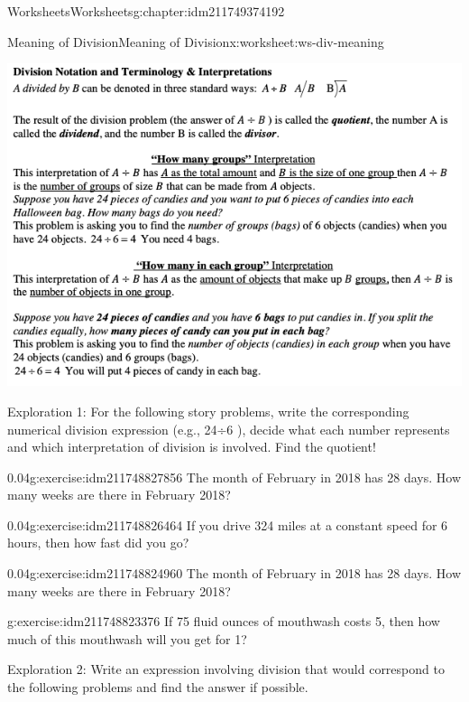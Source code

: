 \documentclass[twoside,11pt,]{book}
\begin{document}
\begin{chapterptx}{Worksheets}{}{Worksheets}{}{}{g:chapter:idm211749374192}
\begin{worksheet-section-numberless}{Meaning of Division}{}{Meaning of Division}{}{}{x:worksheet:ws-div-meaning}
\begin{introduction}{}
\begin{sidebyside}{1}{0}{0}{0}
\begin{sbspanel}{1}
\includegraphics[width=1\linewidth]{images/div-meaning.png}
\end{sbspanel}%
\end{sidebyside}%
%
\par
Exploration 1: For the following story problems, write the corresponding numerical division expression (e.g.,  24÷6 ), decide what each number represents and which interpretation of division is involved. Find the quotient!%
\end{introduction}%
\begin{divisionexercise}{1}{}{0.04}{g:exercise:idm211748827856}%
The month of February in 2018 has 28 days. How many weeks are there in February 2018?%
\end{divisionexercise}%
\begin{divisionexercise}{2}{}{0.04}{g:exercise:idm211748826464}%
If you drive 324 miles at a constant speed for 6 hours, then how fast did you go?%
\end{divisionexercise}%
\begin{divisionexercise}{3}{}{0.04}{g:exercise:idm211748824960}%
The month of February in 2018 has 28 days. How many weeks are there in February 2018?%
\end{divisionexercise}%
\begin{divisionexercise}{4}{}{}{g:exercise:idm211748823376}%
If 75 fluid ounces of mouthwash costs \textdollar{}5, then how much of this mouthwash will you get for \textdollar{}1?%
\end{divisionexercise}%
\clearpage
\begin{introduction}{}%
Exploration 2: Write an expression involving division that would correspond to the following problems and find the answer if possible.%

\end{introduction}
\end{worksheet-section-numberless}
\end{chapterptx}
\end{document}
